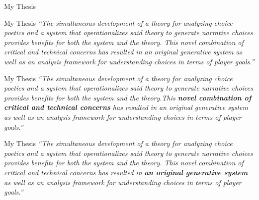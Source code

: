 \documentclass[xcolor=x11names]{beamer}
\begin{document}
\begin{frame}{My Thesis}
  \vspace*{-0.05ex}%
  \hspace*{-0.25ex}%
\end{frame}

\begin{frame}{My Thesis}
  \justifying
  \itshape
  ``The simultaneous development of a theory for analyzing choice poetics and a system that operationalizes said theory to generate narrative choices provides benefits for both the system and the theory. This novel combination of critical and technical concerns has resulted in an original generative system as well as an analysis framework for understanding choices in terms of player goals.''
\end{frame}

\begin{frame}{My Thesis}
  \justifying
  \itshape
  ``The simultaneous development of a theory for analyzing choice poetics and a system that operationalizes said theory to generate narrative choices provides benefits for both the system and the theory.This \textbf{novel combination of critical and technical concerns} has resulted in an original generative system as well as an analysis framework for understanding choices in terms of player goals.''
\end{frame}

\begin{frame}{My Thesis}
  \justifying
  \itshape
  ``The simultaneous development of a theory for analyzing choice poetics and a system that operationalizes said theory to generate narrative choices provides benefits for both the system and the theory. This novel combination of critical and technical concerns has resulted in \textbf{an original generative system} as well as an analysis framework for understanding choices in terms of player goals.''
\end{frame}
\end{document}
